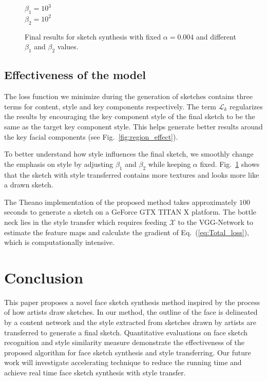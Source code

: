 \documentclass[10pt,twocolumn,letterpaper]{article}
\begin{document}
\begin{figure}[htbp]
\begin{minipage}[t]{0.16\linewidth}
$\beta_1  = 10^{3} $\\
$\beta_2  = 10^{2} $
\end{minipage}
\caption{Final results for sketch synthesis with fixed $\alpha=0.004$ and different $\beta_1$ and $\beta_2$ values.}
\label{fig:alphg_effect}
\end{figure}

\subsection{Effectiveness of the model}

The loss function we minimize during the generation of sketches contains three terms for content, style and key components respectively. The term $\mathcal{L}_{k} $ regularizes the results by encouraging the key component style of the final sketch to be the same as the target key component style. This helps generate better results around the key facial components (see Fig.~\ref{fig:region_effect}). 

To better understand how style influences the final sketch, we smoothly change the emphasis on style by adjusting $\beta_1$ and $\beta_2$ while keeping $\alpha$  fixed. Fig.~\ref{fig:alphg_effect} shows that the sketch with style transferred contains more textures and looks more like a drawn sketch.

The Theano implementation of the proposed method takes approximately $100$ seconds to generate a sketch on a GeForce GTX TITAN X platform. The bottle neck lies in the style transfer which requires feeding $\mathcal{X}$ to the VGG-Network to estimate the feature maps and calculate the gradient of Eq.~(\ref{eq:Total_loss}), which is computationally intensive. 

\section{Conclusion}

This paper proposes a novel face sketch synthesis method inspired by the process of how artists draw sketches. In our method, the outline of the face is delineated by a content network and the style extracted from sketches drawn by artists are transferred to generate a final sketch. Quantitative evaluations on face sketch recognition and style similarity measure demonstrate the effectiveness of the proposed algorithm for face sketch synthesis and style transferring. Our future work will investigate accelerating technique to reduce the running time and achieve real time face sketch synthesis with style transfer.


{\small


}
\end{document}

